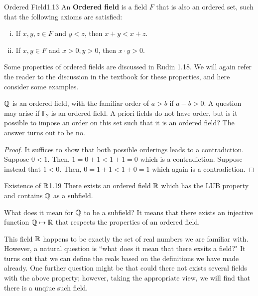 \setcounter{rudin}{16}
\begin{definition}{Ordered Field}{1.13}
    An \textbf{Ordered field} is a field $F$ that is also an ordered set, such that the following axioms are satisfied:
    \begin{enumerate}[(i)]
        \item If $x, y, z \in F$ and $y < z$, then $x + y < x + z$.
        \item If $x, y \in F$ and $x > 0, y > 0$, then $x\cdot y > 0$.
    \end{enumerate}
\end{definition}
\noindent Some properties of ordered fields are discussed in Rudin 1.18. We will again refer the reader to the discussion in the textbook for these properties, and here consider some examples.

$\mathbb{Q}$ is an ordered field, with the familiar order of $a > b$ if $a - b > 0$. A question may arise if $\mathbb{F}_2$ is an ordered field. A priori fields do not have order, but is it possible to impose an order on this set such that it is an ordered field? The answer turns out to be no.

\begin{proof}
    It suffices to show that both possible orderings leads to a contradiction. Suppose $0 < 1$. Then, $1 = 0 + 1 < 1 + 1 = 0$ which is a contradiction. Suppose instead that $1 < 0$. Then, $0 = 1 + 1 < 1 + 0 = 1$ which again is a contradiction.
\end{proof}


\begin{theorem}{Existence of $\mathbb{R}$}{1.19}
    There exists an ordered field $\mathbb{R}$ which has the LUB property and contains $\mathbb{Q}$ as a subfield. 
\end{theorem}
\noindent What does it mean for $\mathbb{Q}$ to be a subfield? It means that there exists an injective function $\mathbb{Q} \mapsto \mathbb{R}$ that respects the properties of an ordered field.

This field $\mathbb{R}$ happens to be exactly the set of real numbers we are familiar with. However, a natural question is ``what does it mean that there exsits a field?" It turns out that we can define the reals based on the definitions we have made already. One further question might be that could there not exists several fields with the above property; however, taking the appropriate view, we will find that there is a unqiue such field. 

